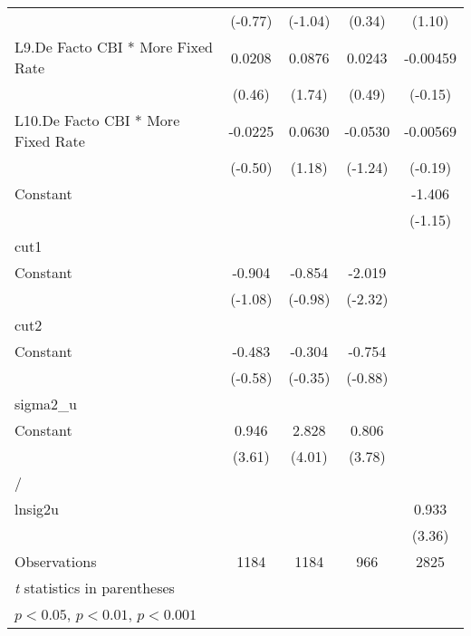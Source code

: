 {\begin{longtable}{l*{4}{c}}
                &  (-0.77)         &  (-1.04)         &   (0.34)         &   (1.10)         \\
[1em]
L9.De Facto CBI * More Fixed Rate&   0.0208         &   0.0876         &   0.0243         & -0.00459         \\
                &   (0.46)         &   (1.74)         &   (0.49)         &  (-0.15)         \\
[1em]
L10.De Facto CBI * More Fixed Rate&  -0.0225         &   0.0630         &  -0.0530         & -0.00569         \\
                &  (-0.50)         &   (1.18)         &  (-1.24)         &  (-0.19)         \\
[1em]
Constant        &                  &                  &                  &   -1.406         \\
                &                  &                  &                  &  (-1.15)         \\
\hline
cut1            &                  &                  &                  &                  \\
Constant        &   -0.904         &   -0.854         &   -2.019\sym{*}  &                  \\
                &  (-1.08)         &  (-0.98)         &  (-2.32)         &                  \\
\hline
cut2            &                  &                  &                  &                  \\
Constant        &   -0.483         &   -0.304         &   -0.754         &                  \\
                &  (-0.58)         &  (-0.35)         &  (-0.88)         &                  \\
\hline
sigma2\_u        &                  &                  &                  &                  \\
Constant        &    0.946\sym{***}&    2.828\sym{***}&    0.806\sym{***}&                  \\
                &   (3.61)         &   (4.01)         &   (3.78)         &                  \\
\hline
/               &                  &                  &                  &                  \\
lnsig2u         &                  &                  &                  &    0.933\sym{***}\\
                &                  &                  &                  &   (3.36)         \\
\hline
Observations    &     1184         &     1184         &      966         &     2825         \\
\hline\hline
\multicolumn{5}{l}{\footnotesize \textit{t} statistics in parentheses}\\
\multicolumn{5}{l}{\footnotesize \sym{*} \(p<0.05\), \sym{**} \(p<0.01\), \sym{***} \(p<0.001\)}\\
\end{longtable}
}
